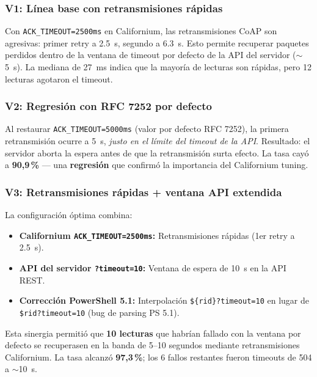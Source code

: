 \documentclass[11pt,a4paper]{article}
\begin{document}
\subsubsection{V1: Línea base con retransmisiones rápidas}

Con \texttt{ACK\_TIMEOUT=2500ms} en Californium, las retransmisiones CoAP son agresivas: primer retry a \SI{2.5}{\second}, segundo a \SI{6.3}{\second}. Esto permite recuperar paquetes perdidos dentro de la ventana de timeout por defecto de la API del servidor ($\sim$\SI{5}{\second}). La mediana de \SI{27}{\milli\second} indica que la mayoría de lecturas son rápidas, pero 12 lecturas agotaron el timeout.

\subsubsection{V2: Regresión con RFC 7252 por defecto}

Al restaurar \texttt{ACK\_TIMEOUT=5000ms} (valor por defecto RFC 7252), la primera retransmisión ocurre a \SI{5}{\second}, \textit{justo en el límite del timeout de la API}. Resultado: el servidor aborta la espera antes de que la retransmisión surta efecto. La tasa cayó a \textbf{90,9\,\%} --- una \textbf{regresión} que confirmó la importancia del Californium tuning.

\subsubsection{V3: Retransmisiones rápidas + ventana API extendida}

La configuración óptima combina:
\begin{itemize}[leftmargin=1.2cm]
    \item \textbf{Californium \texttt{ACK\_TIMEOUT=2500ms}:} Retransmisiones rápidas (1er retry a \SI{2.5}{\second}).
    \item \textbf{API del servidor \texttt{?timeout=10}:} Ventana de espera de \SI{10}{\second} en la API REST.
    \item \textbf{Corrección PowerShell 5.1:} Interpolación \texttt{\$\{rid\}?timeout=10} en lugar de \texttt{\$rid?timeout=10} (bug de parsing PS 5.1).
\end{itemize}

\noindent Esta sinergia permitió que \textbf{10 lecturas} que habrían fallado con la ventana por defecto se recuperasen en la banda de 5--10 segundos mediante retransmisiones Californium. La tasa alcanzó \textbf{97,3\,\%}; los 6 fallos restantes fueron timeouts de \SI{504}{} a $\sim$\SI{10}{\second}.
\end{document}
